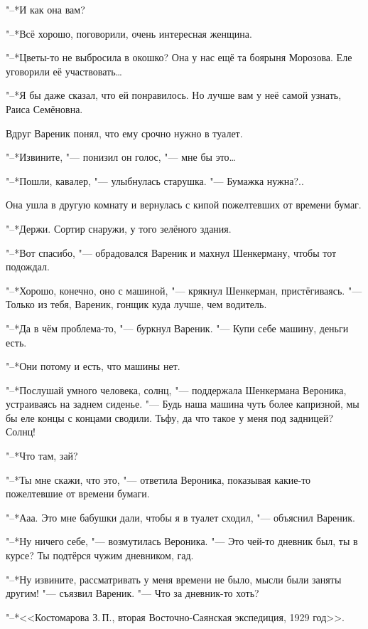\textspace

"--*И как она вам?

"--*Всё хорошо, поговорили, очень интересная женщина.

"--*Цветы-то не выбросила в окошко?
Она у нас ещё та боярыня Морозова.
Еле уговорили её участвовать\ldots{}

"--*Я бы даже сказал, что ей понравилось.
Но лучше вам у неё самой узнать, Раиса Семёновна.

Вдруг Вареник понял, что ему срочно нужно в туалет.

"--*Извините, "--- понизил он голос, "--- мне бы это\ldots{}

"--*Пошли, кавалер, "--- улыбнулась старушка.
"--- Бумажка нужна?..

Она ушла в другую комнату и вернулась с кипой пожелтевших от времени бумаг.

"--*Держи.
Сортир снаружи, у того зелёного здания.

"--*Вот спасибо, "--- обрадовался Вареник и махнул Шенкерману, чтобы тот подождал.

\textspace

\asterism

\textspace

"--*Хорошо, конечно, оно с машиной, "--- крякнул Шенкерман, пристёгиваясь.
"--- Только из тебя, Вареник, гонщик куда лучше, чем водитель.

"--*Да в чём проблема-то, "--- буркнул Вареник.
"--- Купи себе машину, деньги есть.

"--*Они потому и есть, что машины нет.

"--*Послушай умного человека, солнц, "--- поддержала Шенкермана Вероника, устраиваясь на заднем сиденье.
"--- Будь наша машина чуть более капризной, мы бы еле концы с концами сводили.
Тьфу, да что такое у меня под задницей?
Солнц!

"--*Что там, зай?

"--*Ты мне скажи, что это, "--- ответила Вероника, показывая какие-то пожелтевшие от времени бумаги.

"--*Ааа.
Это мне бабушки дали, чтобы я в туалет сходил, "--- объяснил Вареник.

"--*Ну ничего себе, "--- возмутилась Вероника.
"--- Это чей-то дневник был, ты в курсе?
Ты подтёрся чужим дневником, гад.

"--*Ну извините, рассматривать у меня времени не было, мысли были заняты другим! "--- съязвил Вареник.
"--- Что за дневник-то хоть?

"--*<<Костомарова З.\,П., вторая Восточно-Саянская экспедиция, 1929 год>>.

